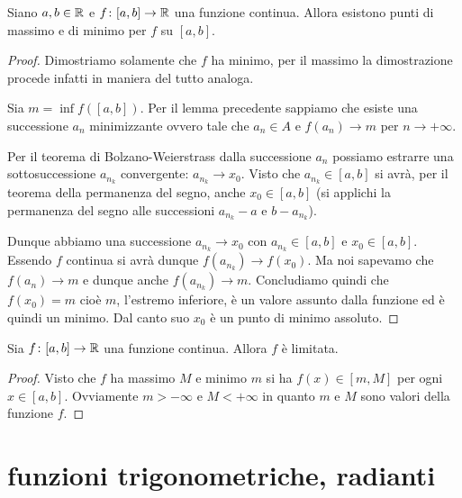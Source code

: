 \begin{theorem}[Weierstrass]%
\label{th:weierstrass}%
\mymark{***}%
%
%
%
Siano $a,b\in {\mathbb R}$ e $f\colon [a,b]\to {\mathbb R}$ una funzione continua.
%
Allora esistono punti di massimo e di minimo per $f$ su $[a,b]$.
\end{theorem}
%
\begin{proof}
\mymark{***}%
Dimostriamo solamente che $f$ ha minimo, per il massimo la dimostrazione procede
infatti in maniera del tutto analoga.

Sia $m= \inf f([a,b])$.
Per il lemma precedente sappiamo che esiste una successione $a_n$ minimizzante ovvero tale che
$a_n \in A$ e $f(a_n)\to m$ per $n\to +\infty$.

Per il teorema di Bolzano-Weierstrass dalla successione $a_n$ possiamo estrarre una sottosuccessione 
$a_{n_k}$ convergente: $a_{n_k} \to x_0$.
Visto che $a_{n_k} \in [a,b]$ si avrà, per il teorema della permanenza del segno, anche 
$x_0 \in [a,b]$ (si applichi la permanenza del segno alle successioni $a_{n_k}-a$ e $b-a_{n_k}$).

Dunque abbiamo una successione $a_{n_k}\to x_0$ con $a_{n_k}\in [a,b]$ e
$x_0 \in [a,b]$. Essendo $f$ continua si avrà dunque $f(a_{n_k}) \to f(x_0)$.
Ma noi sapevamo che $f(a_n)\to m$ e dunque anche $f(a_{n_k}) \to m$.
Concludiamo quindi che $f(x_0) = m$ cioè $m$, l'estremo inferiore,
è un valore assunto dalla funzione ed è quindi un minimo.
Dal canto suo $x_0$ è un punto di minimo assoluto.
\end{proof}

\begin{corollary}
Sia $f\colon [a,b]\to {\mathbb R}$ una funzione continua. Allora $f$ è limitata.
\end{corollary}
\begin{proof}
Visto che $f$ ha massimo $M$ e minimo $m$ si ha $f(x)\in [m,M]$ per ogni $x\in[a,b]$.
Ovviamente $m>-\infty$ e $M<+\infty$ in quanto $m$ e $M$ sono valori della funzione $f$.
\end{proof}


\section{funzioni trigonometriche, radianti}

